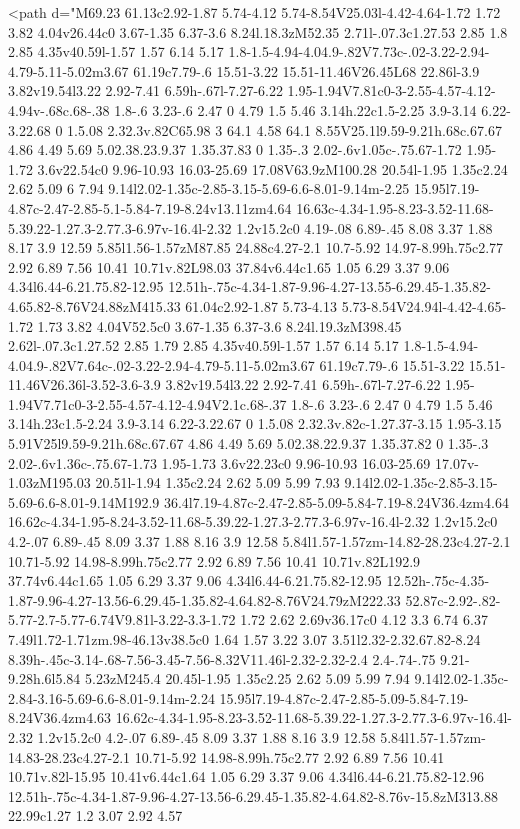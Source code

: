 {{{<path d="M69.23 61.13c2.92-1.87 5.74-4.12 5.74-8.54V25.03l-4.42-4.64-1.72 1.72 3.82 4.04v26.44c0 3.67-1.35 6.37-3.6 8.24l.18.3zM52.35 2.71l-.07.3c1.27.53 2.85 1.8 2.85 4.35v40.59l-1.57 1.57 6.14 5.17 1.8-1.5-4.94-4.04.9-.82V7.73c-.02-3.22-2.94-4.79-5.11-5.02m3.67 61.19c7.79-.6 15.51-3.22 15.51-11.46V26.45L68 22.86l-3.9 3.82v19.54l3.22 2.92-7.41 6.59h-.67l-7.27-6.22 1.95-1.94V7.81c0-3-2.55-4.57-4.12-4.94v-.68c.68-.38 1.8-.6 3.23-.6 2.47 0 4.79 1.5 5.46 3.14h.22c1.5-2.25 3.9-3.14 6.22-3.22.68 0 1.5.08 2.32.3v.82C65.98 3 64.1 4.58 64.1 8.55V25.1l9.59-9.21h.68c.67.67 4.86 4.49 5.69 5.02.38.23.9.37 1.35.37.83 0 1.35-.3 2.02-.6v1.05c-.75.67-1.72 1.95-1.72 3.6v22.54c0 9.96-10.93 16.03-25.69 17.08V63.9zM100.28 20.54l-1.95 1.35c2.24 2.62 5.09 6 7.94 9.14l2.02-1.35c-2.85-3.15-5.69-6.6-8.01-9.14m-2.25 15.95l7.19-4.87c-2.47-2.85-5.1-5.84-7.19-8.24v13.11zm4.64 16.63c-4.34-1.95-8.23-3.52-11.68-5.39.22-1.27.3-2.77.3-6.97v-16.4l-2.32 1.2v15.2c0 4.19-.08 6.89-.45 8.08 3.37 1.88 8.17 3.9 12.59 5.85l1.56-1.57zM87.85 24.88c4.27-2.1 10.7-5.92 14.97-8.99h.75c2.77 2.92 6.89 7.56 10.41 10.71v.82L98.03 37.84v6.44c1.65 1.05 6.29 3.37 9.06 4.34l6.44-6.21.75.82-12.95 12.51h-.75c-4.34-1.87-9.96-4.27-13.55-6.29.45-1.35.82-4.65.82-8.76V24.88zM415.33 61.04c2.92-1.87 5.73-4.13 5.73-8.54V24.94l-4.42-4.65-1.72 1.73 3.82 4.04V52.5c0 3.67-1.35 6.37-3.6 8.24l.19.3zM398.45 2.62l-.07.3c1.27.52 2.85 1.79 2.85 4.35v40.59l-1.57 1.57 6.14 5.17 1.8-1.5-4.94-4.04.9-.82V7.64c-.02-3.22-2.94-4.79-5.11-5.02m3.67 61.19c7.79-.6 15.51-3.22 15.51-11.46V26.36l-3.52-3.6-3.9 3.82v19.54l3.22 2.92-7.41 6.59h-.67l-7.27-6.22 1.95-1.94V7.71c0-3-2.55-4.57-4.12-4.94V2.1c.68-.37 1.8-.6 3.23-.6 2.47 0 4.79 1.5 5.46 3.14h.23c1.5-2.24 3.9-3.14 6.22-3.22.67 0 1.5.08 2.32.3v.82c-1.27.37-3.15 1.95-3.15 5.91V25l9.59-9.21h.68c.67.67 4.86 4.49 5.69 5.02.38.22.9.37 1.35.37.82 0 1.35-.3 2.02-.6v1.36c-.75.67-1.73 1.95-1.73 3.6v22.23c0 9.96-10.93 16.03-25.69 17.07v-1.03zM195.03 20.51l-1.94 1.35c2.24 2.62 5.09 5.99 7.93 9.14l2.02-1.35c-2.85-3.15-5.69-6.6-8.01-9.14M192.9 36.4l7.19-4.87c-2.47-2.85-5.09-5.84-7.19-8.24V36.4zm4.64 16.62c-4.34-1.95-8.24-3.52-11.68-5.39.22-1.27.3-2.77.3-6.97v-16.4l-2.32 1.2v15.2c0 4.2-.07 6.89-.45 8.09 3.37 1.88 8.16 3.9 12.58 5.84l1.57-1.57zm-14.82-28.23c4.27-2.1 10.71-5.92 14.98-8.99h.75c2.77 2.92 6.89 7.56 10.41 10.71v.82L192.9 37.74v6.44c1.65 1.05 6.29 3.37 9.06 4.34l6.44-6.21.75.82-12.95 12.52h-.75c-4.35-1.87-9.96-4.27-13.56-6.29.45-1.35.82-4.64.82-8.76V24.79zM222.33 52.87c-2.92-.82-5.77-2.7-5.77-6.74V9.81l-3.22-3.3-1.72 1.72 2.62 2.69v36.17c0 4.12 3.3 6.74 6.37 7.49l1.72-1.71zm.98-46.13v38.5c0 1.64 1.57 3.22 3.07 3.51l2.32-2.32.67.82-8.24 8.39h-.45c-3.14-.68-7.56-3.45-7.56-8.32V11.46l-2.32-2.32-2.4 2.4-.74-.75 9.21-9.28h.6l5.84 5.23zM245.4 20.45l-1.95 1.35c2.25 2.62 5.09 5.99 7.94 9.14l2.02-1.35c-2.84-3.16-5.69-6.6-8.01-9.14m-2.24 15.95l7.19-4.87c-2.47-2.85-5.09-5.84-7.19-8.24V36.4zm4.63 16.62c-4.34-1.95-8.23-3.52-11.68-5.39.22-1.27.3-2.77.3-6.97v-16.4l-2.32 1.2v15.2c0 4.2-.07 6.89-.45 8.09 3.37 1.88 8.16 3.9 12.58 5.84l1.57-1.57zm-14.83-28.23c4.27-2.1 10.71-5.92 14.98-8.99h.75c2.77 2.92 6.89 7.56 10.41 10.71v.82l-15.95 10.41v6.44c1.64 1.05 6.29 3.37 9.06 4.34l6.44-6.21.75.82-12.96 12.51h-.75c-4.34-1.87-9.96-4.27-13.56-6.29.45-1.35.82-4.64.82-8.76v-15.8zM313.88 22.99c1.27 1.2 3.07 2.92 4.57 }}}
